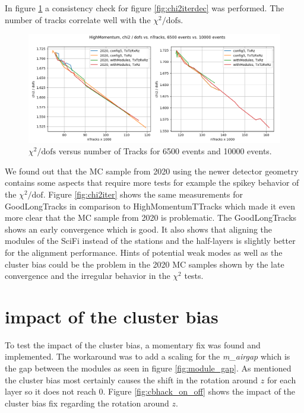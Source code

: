 In figure \ref{fig:chi2tracksdec} a consistency check for figure
\ref{fig:chi2iterdec} was performed. The number of tracks correlate well with
the $\chi^2 / \text{dofs}$.

\begin{figure}
  \centering
  \includegraphics[width=\textwidth]{plots/LHCB_week_dec/chi2_vs_tracks_normal.png}
  \caption{$\chi^2 / \text{dofs}$ versus number of Tracks for 6500 events and 10000 events.}
  \label{fig:chi2tracksdec}
\end{figure}

We found out that the MC sample from 2020 using the newer detector geometry contains some aspects that require more tests for example the spikey behavior of the $\chi^2 / \text{dof}$. Figure \ref{fig:chi2iter} shows the same measurements for GoodLongTracks in comparison to HighMomentumTTracks which made it even more clear that the MC sample from 2020 is problematic. The GoodLongTracks shows an early convergence which is good. It also shows that aligning the modules of the SciFi instead of the stations and the half-layers is slightly better for the alignment performance. Hints of potential weak modes as well as the cluster bias could be the problem in the 2020 MC samples shown by the late convergence and the irregular behavior in the $\chi^2$ tests.

\section{impact of the cluster bias}
\label{sec:clusterbias}

To test the impact of the cluster bias, a momentary fix was found and implemented. The workaround was to add a scaling for the \textit{m\_airgap}\cite{gap} which is the gap between the modules as seen in figure \ref{fig:module_gap}.
As mentioned the cluster bias most certainly causes the shift in the rotation around $z$ for each layer so it does not reach 0.
Figure \ref{fig:cbhack_on_off} shows the impact of the cluster bias fix regarding the rotation around $z$.

